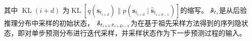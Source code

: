 其中 $\operatorname{KL}(i+d)$ 为$\operatorname{KL}\left[q\left(\boldsymbol{s}_{t_{i+d}} \right) \| p\left(\boldsymbol{s}_{t_{i+d}} \mid \boldsymbol{\hat s}_{t_{i+d-1}}\right)\right]$的缩写。
$\boldsymbol{\hat{s}}_{t_{i}}$是从后验推理分布中采样的初始状态，
$\boldsymbol{\hat{s}}_{t_{i+1}:t_{i+D-1}}$为在基于祖先采样方法得到的序列隐状态，即对单步预测分布进行迭代采样，并采样状态作为下一步预测过程的输入。

